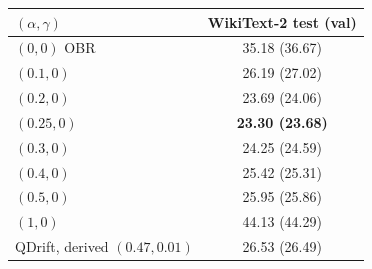 \begin{tabular}{lc}
\toprule
$(\alpha,\gamma)$ & WikiText-2 test (val) \\
\midrule
$(0, 0)$ OBR & 35.18 (36.67) \\
$(0.1, 0)$ & 26.19 (27.02) \\
$(0.2, 0)$ & 23.69 (24.06) \\
$(0.25, 0)$ & \textbf{23.30 (23.68)} \\
$(0.3, 0)$ & 24.25 (24.59) \\
$(0.4, 0)$ & 25.42 (25.31) \\
$(0.5, 0)$ & 25.95 (25.86) \\
$(1, 0)$ & 44.13 (44.29) \\
\midrule
QDrift, derived $(0.47, 0.01)$ & 26.53 (26.49) \\
\bottomrule
\end{tabular}
